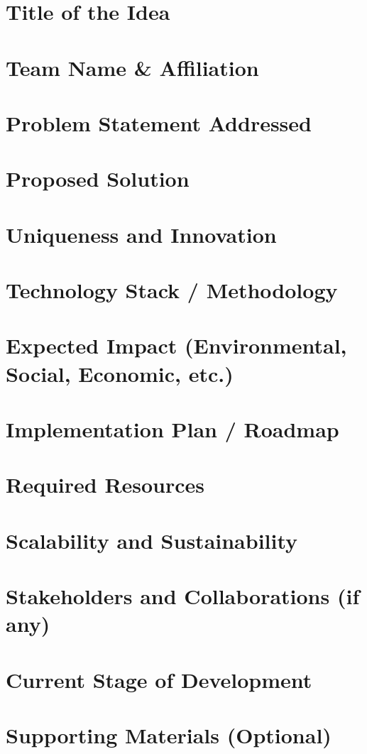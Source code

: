 \documentclass[12pt,a4paper]{article}
\begin{document}
	
	\section{Title of the Idea}
	
	\section{Team  Name \& Affiliation}
	
	\section{Problem Statement Addressed}
	
	\section{Proposed Solution}
	
	\section{Uniqueness and Innovation}
	
	\section{Technology Stack / Methodology}
	
	\section{Expected Impact (Environmental, Social, Economic, etc.)}
	
	\section{Implementation Plan / Roadmap}
	
	\section{Required Resources}
	
	\section{Scalability and Sustainability}
	
	\section{Stakeholders and Collaborations (if any)}
	
	\section{Current Stage of Development}
	
	\section{Supporting Materials (Optional)}
	
	
\end{document}
